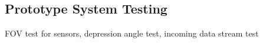 \subsection{Prototype System Testing}
\noindent FOV test for sensors, depression angle test, incoming data stream test